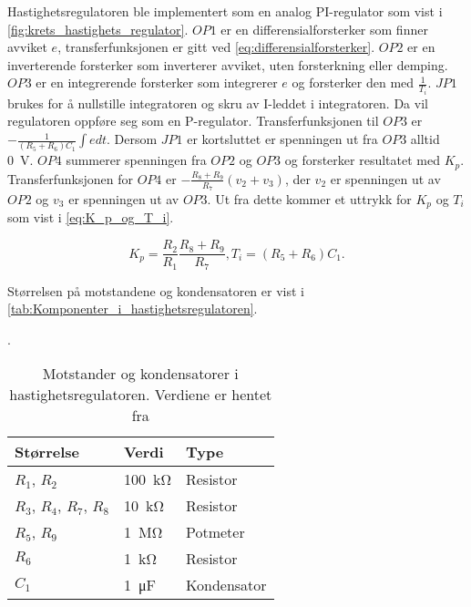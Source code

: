 Hastighetsregulatoren ble implementert som en analog PI-regulator som vist i \autoref{fig:krets_hastighets_regulator}. $OP1$ er en differensialforsterker som finner avviket $e$, transferfunksjonen er gitt ved \autoref{eq:differensialforsterker}.
$OP2$ er en inverterende forsterker som inverterer avviket, uten forsterkning eller demping.
$OP3$ er en integrerende forsterker som integrerer $e$ og forsterker den med $\frac{1}{T_i}$. $JP1$ brukes for å nullstille integratoren og skru av I-leddet i integratoren. Da vil regulatoren oppføre seg som en P-regulator. Transferfunksjonen til $OP3$ er $-\frac{1}{(R_5 + R_6) C_1} \int e dt$. Dersom $JP1$ er kortsluttet er spenningen ut fra $OP3$ alltid {\SI{0}{\volt}}.
$OP4$ summerer spenningen fra $OP2$ og $OP3$ og forsterker resultatet med $K_p$. Transferfunksjonen for $OP4$ er $-\frac{R_8 + R_9}{R_7}(v_2 + v_3)$, der $v_2$ er spenningen ut av $OP2$ og $v_3$ er spenningen ut av $OP3$. Ut fra dette kommer et uttrykk for $K_p$ og $T_i$ som vist i \autoref{eq:K_p_og_T_i}.

\begin{equation}
    \label{eq:K_p_og_T_i}
    K_p = \frac{R_2}{R_1} \frac{R_8 + R_9}{R_7}, 
    T_i = (R_5 + R_6) C_1.
\end{equation}

Størrelsen på motstandene og kondensatoren er vist i \autoref{tab:Komponenter_i_hastighetsregulatoren}.

\begin{table}[h]
    \centering
    \caption{Motstander og kondensatorer i hastighetsregulatoren. Verdiene er hentet fra \cite{AnalogMotorlabbOppgaver}}.
    \begin{tabular}{lll}
        \toprule
        Størrelse & Verdi & Type \\
		\midrule
        $R_1$, $R_2$ & \SI{100}{\kilo\ohm} & Resistor\\
        $R_3$, $R_4$, $R_7$, $R_8$ & \SI{10}{\kilo\ohm} & Resistor \\
        $R_5$, $R_9$ & \SI{1}{\mega\ohm} & Potmeter \\
        $R_6$ & \SI{1}{\kilo\ohm} & Resistor \\
        $C_1$ & \SI{1}{\micro\farad} & Kondensator \\
        \bottomrule
    \end{tabular}
    \label{tab:Komponenter_i_hastighetsregulatoren}
\end{table}







